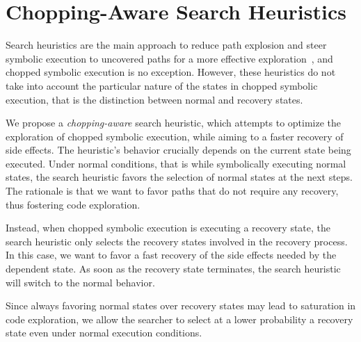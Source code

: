 
\section{Chopping-Aware Search Heuristics}
\label{Se:Search}

Search heuristics are the main approach to reduce path explosion and
steer symbolic execution to uncovered paths for a more effective
exploration~\cite{exe,klee,sen:concolicheuristics,fitsymex:dsn09}, and
chopped symbolic execution is no exception. However, these heuristics
do not take into account the particular nature of the states in
chopped symbolic execution, that is the distinction between normal and
recovery states.

We propose a \textit{chopping-aware} search heuristic, which attempts
to optimize the exploration of chopped symbolic execution, while
aiming to a faster recovery of side effects. The heuristic's behavior
crucially depends on the current state being executed. Under normal
conditions, that is while symbolically executing normal states,
the search heuristic favors the selection of normal states at the next
steps. The rationale is that we want to favor paths that do not
require any recovery, thus fostering code exploration.

Instead, when chopped symbolic execution is executing a recovery
state, the search heuristic only selects the recovery states involved
in the recovery process. In this case, we want to favor a fast
recovery of the side effects needed by the dependent state. As soon as
the recovery state terminates, the search heuristic will switch to the
normal behavior.

Since always favoring normal states over recovery states may lead to
saturation in code exploration, we allow the searcher to select at a
lower probability a recovery state even under normal execution
conditions.

